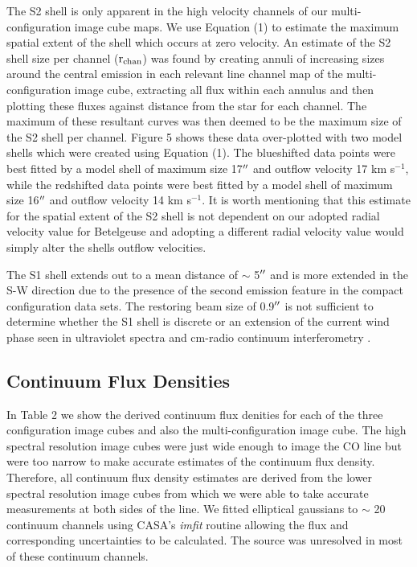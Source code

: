 \documentclass[preprint2]{aastex}
\begin{document}
The S2 shell is only apparent in the high velocity channels of our multi-configuration image cube maps. We use Equation (1) to estimate the maximum spatial extent of the shell which occurs at zero velocity. An estimate of the S2 shell size per channel ($\rm{r_{chan}}$) was found by creating annuli of increasing sizes around the central emission in each relevant line channel map of the multi-configuration image cube, extracting all flux within each annulus and then plotting these fluxes against distance from the star for each channel. The maximum of these resultant curves was then deemed to be the maximum size of the S2 shell per channel. Figure 5 shows these data over-plotted with two model shells which were created using Equation (1). The blueshifted data points were best fitted by a model shell of maximum size 17$\mbox{$^{\prime\prime}$}$ and outflow velocity 17 km s${}^{-1}$, while the redshifted data points were best fitted by a model shell of maximum size 16$\mbox{$^{\prime\prime}$}$ and outflow velocity 14 km s${}^{-1}$. It is worth mentioning that this estimate for the spatial extent of the S2 shell is not dependent on our adopted radial velocity value for Betelgeuse and adopting a different radial velocity value would simply alter the shells outflow velocities.

The S1 shell extends out to a mean distance of $\sim$ 5$\mbox{$^{\prime\prime}$}$ and is more extended in the S-W direction due to the presence of the second emission feature in the compact configuration data sets. The restoring beam size of 0.9$\mbox{$^{\prime\prime}$}$ is not sufficient to determine whether the S1 shell is discrete or an extension of the current wind phase seen in ultraviolet spectra \citep{1997ApJ...479..970C} and cm-radio continuum interferometry \citep{1998Natur.392..575L, harper_2001}.

\subsection{Continuum Flux Densities} \label{results4} 

In Table 2 we show the derived continuum flux denities for each of the three configuration image cubes and also the multi-configuration image cube. The high spectral resolution image cubes were just wide enough to image the CO line but were too narrow to make accurate estimates of the continuum flux density. Therefore, all continuum flux density estimates are derived from the lower spectral resolution image cubes from which we were able to take accurate measurements at both sides of the line. We fitted elliptical gaussians to $\sim$ 20 continuum channels using CASA's \textit{imfit} routine allowing the flux and corresponding uncertainties to be calculated. The source was unresolved in most of these continuum channels. 
\end{document}
